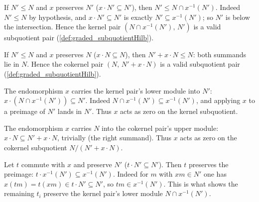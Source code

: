 \begin{lemma}\leanok
  \label{lem:graded_ker_le}
  If \(N' \le N\) and \(x\) preserves \(N'\) (\(x \cdot N' \subseteq N'\)), then
  \(N' \le N \cap x^{-1}(N')\). Indeed \(N' \le N\) by hypothesis, and \(x \cdot N'
  \subseteq N'\) is exactly \(N' \subseteq x^{-1}(N')\); so \(N'\) is below the
  intersection. Hence the kernel pair \((N \cap x^{-1}(N'),\, N')\) is a valid
  subquotient pair (\cref{def:graded_subquotientHilb}).
\end{lemma}

\begin{lemma}\leanok
  \label{lem:graded_coker_le}
  If \(N' \le N\) and \(x\) preserves \(N\) (\(x \cdot N \subseteq N\)), then
  \(N' + x \cdot N \le N\): both summands lie in \(N\). Hence the cokernel pair
  \((N,\, N' + x \cdot N)\) is a valid subquotient pair
  (\cref{def:graded_subquotientHilb}).
\end{lemma}

\begin{lemma}\leanok
  \label{lem:graded_ker_annihilate}
  The endomorphism \(x\) carries the kernel pair's lower module into \(N'\):
  \(x \cdot (N \cap x^{-1}(N')) \subseteq N'\). Indeed \(N \cap x^{-1}(N') \subseteq
  x^{-1}(N')\), and applying \(x\) to a preimage of \(N'\) lands in \(N'\). Thus \(x\)
  acts as zero on the kernel subquotient.
\end{lemma}

\begin{lemma}\leanok
  \label{lem:graded_coker_annihilate}
  The endomorphism \(x\) carries \(N\) into the cokernel pair's upper module:
  \(x \cdot N \subseteq N' + x \cdot N\), trivially (the right summand). Thus \(x\)
  acts as zero on the cokernel subquotient \(N/(N' + x \cdot N)\).
\end{lemma}

\begin{lemma}\leanok
  \label{lem:graded_comap_map_le_of_commute}
  Let \(t\) commute with \(x\) and preserve \(N'\) (\(t \cdot N' \subseteq N'\)). Then
  \(t\) preserves the preimage: \(t \cdot x^{-1}(N') \subseteq x^{-1}(N')\). Indeed for
  \(m\) with \(x m \in N'\) one has \(x(t m) = t(x m) \in t \cdot N' \subseteq N'\), so
  \(t m \in x^{-1}(N')\). This is what shows the remaining \(t_i\) preserve the kernel
  pair's lower module \(N \cap x^{-1}(N')\).
\end{lemma}

